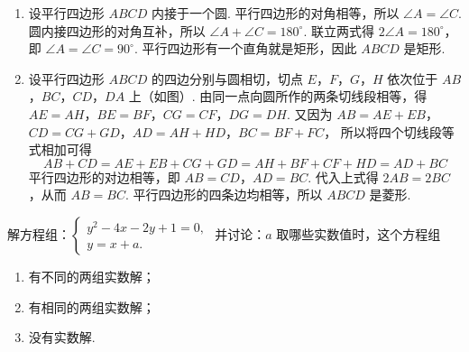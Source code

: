 \begin{solution}
\begin{enumerate}
\item 设平行四边形 \(ABCD\) 内接于一个圆. 平行四边形的对角相等，所以 \(\angle A=\angle C\). 圆内接四边形的对角互补，所以 \(\angle A+\angle C=180^\circ\). 联立两式得 \(2\angle A=180^\circ\)，即 \(\angle A=\angle C=90^\circ\). 平行四边形有一个直角就是矩形，因此 \(ABCD\) 是矩形.


\item 设平行四边形 \(ABCD\) 的四边分别与圆相切，切点 \(E\)，\(F\)，\(G\)，\(H\) 依次位于 \(AB\)，\(BC\)，\(CD\)，\(DA\) 上（如图）. 由同一点向圆所作的两条切线段相等，得 \(AE=AH\)，\(BE=BF\)，\(CG=CF\)，\(DG=DH\). 又因为 \(AB=AE+EB\)，\(CD=CG+GD\)，\(AD=AH+HD\)，\(BC=BF+FC\)，
所以将四个切线段等式相加可得
\[
AB+CD=AE+EB+CG+GD=AH+BF+CF+HD=AD+BC
\]
平行四边形的对边相等，即 \(AB=CD\)，\(AD=BC\). 代入上式得 \(2AB=2BC\)，从而 \(AB=BC\). 平行四边形的四条边均相等，所以 \(ABCD\) 是菱形.

\end{enumerate}
\end{solution}

\begin{problem}
解方程组：\(
\begin{cases}
y^2-4x-2y+1=0,\\
y=x+a.
\end{cases}
\)
并讨论：\(a\) 取哪些实数值时，这个方程组

\begin{enumerate}
\item 有不同的两组实数解；
\item 有相同的两组实数解；
\item 没有实数解.
\end{enumerate}
\end{problem}

